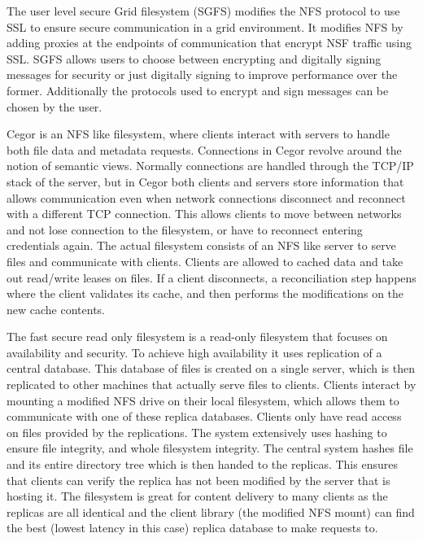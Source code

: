 The user level secure Grid filesystem (SGFS) \cite{Figueiredo2007} modifies
the NFS protocol to use SSL to ensure secure communication in a grid
environment. It modifies NFS by adding proxies at the endpoints of
communication that encrypt NSF traffic using SSL. SGFS allows users to choose
between encrypting and digitally signing messages for security or just
digitally signing to improve performance over the former. Additionally the
protocols used to encrypt and sign messages can be chosen by the user.

Cegor \cite{Shi2004} is an NFS like filesystem, where clients interact with
servers to handle both file data and metadata requests. Connections in Cegor
revolve around the notion of semantic views. Normally connections are handled
through the TCP/IP stack of the server, but in Cegor both clients and servers
store information that allows communication even when network connections
disconnect and reconnect with a different TCP connection. This allows clients
to move between networks and not lose connection to the filesystem, or have to
reconnect entering credentials again. The actual filesystem consists of an NFS
like server to serve files and communicate with clients. Clients are allowed
to cached data and take out read/write leases on files. If a client
disconnects, a reconciliation step happens where the client validates its
cache, and then performs the modifications on the new cache contents.

The fast secure read only filesystem \cite{Fu2000} is a read-only filesystem
that focuses on availability and security. To achieve high availability it
uses replication of a central database. This database of files is created on a
single server, which is then replicated to other machines that actually serve
files to clients. Clients interact by mounting a modified NFS drive on their
local filesystem, which allows them to communicate with one of these replica
databases. Clients only have read access on files provided by the
replications. The system extensively uses hashing to ensure file integrity,
and whole filesystem integrity. The central system hashes file and its entire
directory tree which is then handed to the replicas. This ensures that clients
can verify the replica has not been modified by the server that is hosting it.
The filesystem is great for content delivery to many clients as the replicas
are all identical and the client library (the modified NFS mount) can find the
best (lowest latency in this case) replica database to make requests to.


